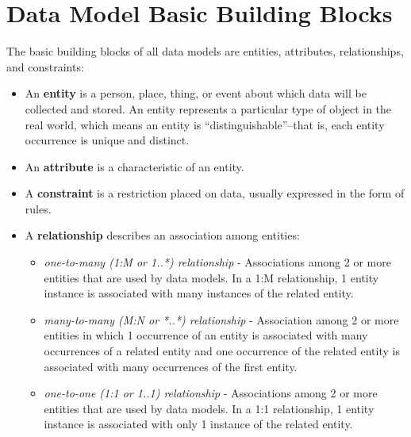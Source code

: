 \documentclass[a4paper, 12pt, titlepage]{report}
\begin{document}
\section{Data Model Basic Building Blocks}
The basic building blocks of all data models are entities, attributes, relationships, and constraints:
\begin{itemize}
\item An \textbf{entity} is a person, place, thing, or event about which data will be collected and stored. An entity represents a particular type of object in the real world, which means an entity is “distinguishable”--that is, each entity occurrence is unique and distinct.
\item An \textbf{attribute} is a characteristic of an entity.
\item A \textbf{constraint} is a restriction placed on data, usually expressed in the form of rules.
\item A \textbf{relationship} describes an association among entities:
\begin{itemize}
\item \emph{one-to-many (1:M or 1..*) relationship} - Associations among 2 or more entities that are used by data models. In a 1:M relationship, 1 entity instance is associated with many instances of the related entity.
\item \emph{many-to-many (M:N or *..*) relationship} - Association among 2 or more entities in which 1 occurrence of an entity is associated with many occurrences of a related entity and one occurrence of the related entity is associated with many occurrences of the first entity.
\item \emph{one-to-one (1:1 or 1..1) relationship} - Associations among 2 or more entities that are used by data models. In a 1:1 relationship, 1 entity instance is associated with only 1 instance of the related entity.
\end{itemize}
\end{itemize}
\pagebreak
\end{document}

